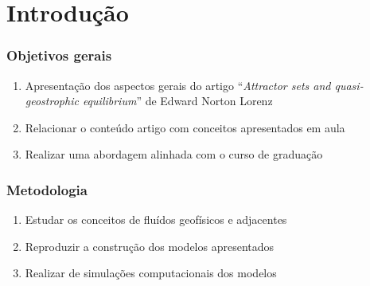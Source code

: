 \section{Introdução} 


\begin{frame}
	\frametitle{Objetivos gerais}
    \begin{enumerate}
        \item Apresentação dos aspectos gerais do artigo ``\textit{Attractor sets and quasi-geostrophic equilibrium}'' de Edward Norton Lorenz
        \item Relacionar o conteúdo artigo com conceitos apresentados em aula
        \item Realizar uma abordagem alinhada com o curso de graduação
    \end{enumerate}
\end{frame}


\begin{frame}
	\frametitle{Metodologia}
    \begin{enumerate}
        \item Estudar os conceitos de fluídos geofísicos e adjacentes
        \item Reproduzir a construção dos modelos apresentados
        \item Realizar de simulações computacionais dos modelos 
    \end{enumerate}
\end{frame}